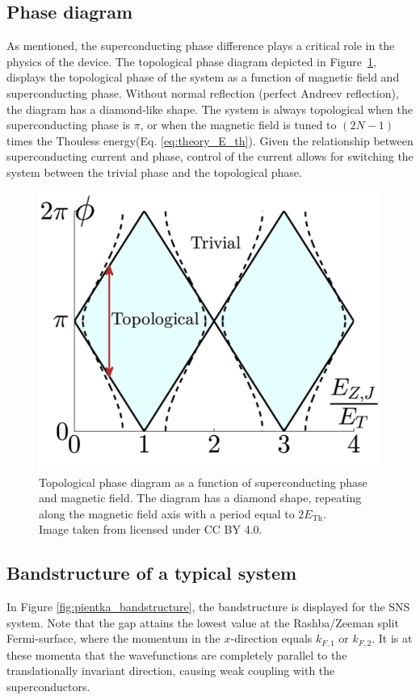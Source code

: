     \subsection{Phase diagram}
        As mentioned, the superconducting phase difference plays a critical role in the physics of the device.
        The topological phase diagram depicted in Figure~\ref{fig:pientka_phase_diagram}, displays the topological phase of the system as a function of magnetic field and superconducting phase.
        Without normal reflection (perfect Andreev reflection), the diagram has a diamond-like shape.
        The system is always topological when the superconducting phase is $\pi$, or when the magnetic field is tuned to $(2N-1)$ times the Thouless energy(Eq. \ref{eq:theory_E_th}).
        Given the relationship between superconducting current and phase, control of the current allows for switching the system between the trivial phase and the topological phase.
        
        \begin{figure}[!htb]
        \centering
        \includegraphics[width=0.5\columnwidth]{figures/pientka_phase_diagram}
        \caption{Topological phase diagram as a function of superconducting phase and magnetic field.
        The diagram has a diamond shape, repeating along the magnetic field axis with a period equal to $2 E_\text{Th}$.\\
        Image taken from \cite{pientka_topological_2017} licensed under CC BY 4.0.
        }
        \label{fig:pientka_phase_diagram}
        \end{figure}
            
    \subsection{Bandstructure of a typical system}
        In Figure \ref{fig:pientka_bandstructure}, the bandstructure is displayed for the SNS system.
        Note that the gap attains the lowest value at the Rashba/Zeeman split Fermi-surface, where the momentum in the $x$-direction equals $k_{F,1}$ or $k_{F,2}$.
        It is at these momenta that the wavefunctions are completely parallel to the translationally invariant direction, causing weak coupling with the superconductors.

